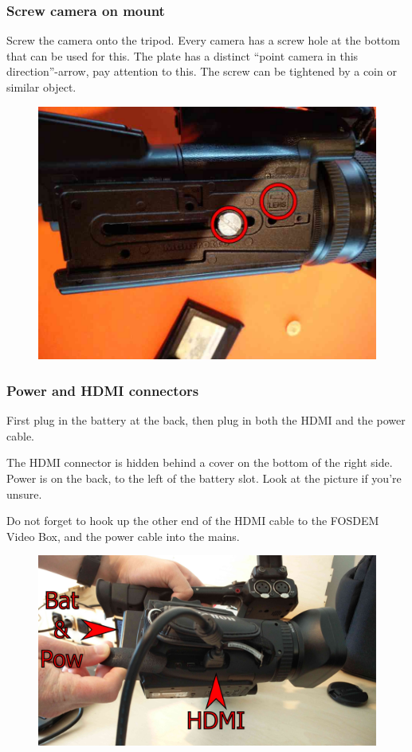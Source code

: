 \documentclass{article}
\begin{document}
\subsubsection{Screw camera on mount}
Screw the camera onto the tripod. Every camera has a screw hole at the bottom that can be used for this. The plate has a distinct ``point camera in this direction''-arrow, pay attention to this. The screw can be tightened by a coin or similar object.

\begin{figure}[H]
  \centering
  \includegraphics[width = 120mm]{Cam00.jpg}
\end{figure}


\subsubsection{Power and HDMI connectors}
First plug in the battery at the back, then plug in both the HDMI and the power cable.

The HDMI connector is hidden behind a cover on the bottom of the right side.
Power is on the back, to the left of the battery slot.
Look at the picture if you're unsure.

Do not forget to hook up the other end of the HDMI cable to the FOSDEM Video Box, and the power cable into the mains.

\begin{figure}[H]
  \centering
\includegraphics[width = 120mm]{Canon01.jpg}
\end{figure}
\end{document}

